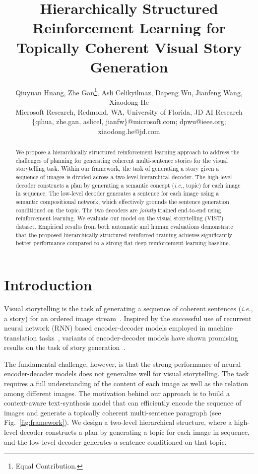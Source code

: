 \documentclass[letterpaper]{article} \usepackage{aaai19}  \usepackage{times}  \usepackage{helvet}  \usepackage{courier}  \usepackage{url}  \usepackage{graphicx}
\begin{document}
\title{Hierarchically Structured Reinforcement Learning for Topically Coherent Visual Story Generation}
\author{Qiuyuan Huang, Zhe Gan\thanks{Equal Contribution.}, Asli Celikyilmaz, Dapeng Wu, Jianfeng Wang, Xiaodong He\\
Microsoft Research, Redmond, WA, University of Florida, JD AI Research\\
\{qihua, zhe.gan, aslicel, jianfw\}@microsoft.com; dpwu@ieee.org; xiaodong.he@jd.com
}
\maketitle
\begin{abstract}
We propose a hierarchically structured reinforcement learning approach to address the challenges of planning for generating coherent multi-sentence stories for the visual storytelling task. Within our framework, the task of generating a story given a sequence of images is divided across a two-level hierarchical decoder. The high-level decoder constructs a plan by generating a semantic concept (\emph{i.e.}, topic) for each image in sequence. The low-level decoder generates a sentence for each image using a semantic compositional network, which effectively grounds the sentence generation conditioned on the topic. The two decoders are \textit{jointly} trained end-to-end using reinforcement learning. We evaluate our model on the visual storytelling (VIST) dataset. Empirical results from both automatic and human evaluations demonstrate that the proposed hierarchically structured reinforced training achieves significantly better performance compared to a strong flat deep reinforcement learning baseline.
\end{abstract}

\section{Introduction} \label{sec:Introduction}
Visual storytelling is the task of generating a sequence of coherent sentences (\emph{i.e.}, a story) for an ordered image stream~\cite{park2015expressing,huang2016visual,liu2017let}. Inspired by the successful use of recurrent neural network (RNN) based encoder-decoder models employed in machine translation tasks~\cite{cho2014learning,sutskever2014sequence}, variants of encoder-decoder models have shown promising results on the task of story generation~\cite{huang2016visual}.

The fundamental challenge, however, is that the strong performance of neural encoder-decoder models does not generalize well for visual storytelling.  
The task requires a full understanding of the content of each image as well as the relation among different images.
The motivation behind our approach is to build a context-aware text-synthesis model that can efficiently encode the sequence of images and generate a topically coherent multi-sentence paragraph (see Fig.~\ref{fig:framework}). We design a two-level hierarchical structure, where a high-level decoder 
constructs a plan by generating a topic for each image in sequence, and the low-level decoder generates a sentence conditioned on that topic. 
\end{document}
